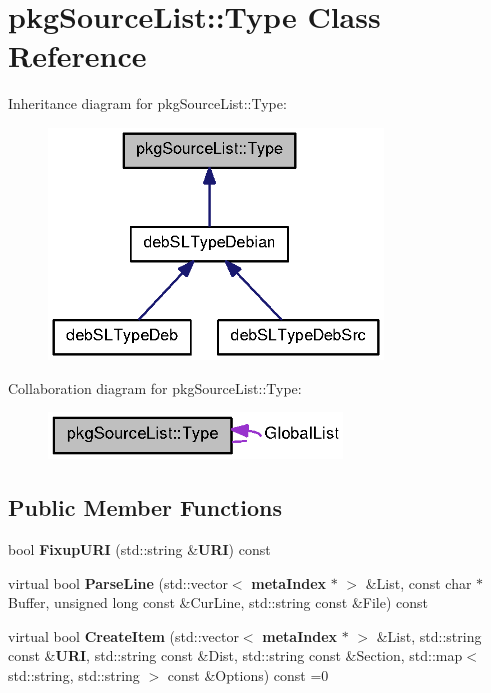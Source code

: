 \section{pkg\-Source\-List\-:\-:\-Type \-Class \-Reference}
\label{classpkgSourceList_1_1Type}


\-Inheritance diagram for pkg\-Source\-List\-:\-:\-Type\-:
\nopagebreak
\begin{figure}[H]
\begin{center}
\leavevmode
\includegraphics[width=252pt]{classpkgSourceList_1_1Type__inherit__graph}
\end{center}
\end{figure}


\-Collaboration diagram for pkg\-Source\-List\-:\-:\-Type\-:
\nopagebreak
\begin{figure}[H]
\begin{center}
\leavevmode
\includegraphics[width=221pt]{classpkgSourceList_1_1Type__coll__graph}
\end{center}
\end{figure}
\subsection*{\-Public \-Member \-Functions}
\begin{DoxyCompactItemize}
\item 
bool {\bfseries \-Fixup\-U\-R\-I} (std\-::string \&{\bf \-U\-R\-I}) const \label{classpkgSourceList_1_1Type_a42dffda008541948a897df68efd7ac11}

\item 
virtual bool {\bfseries \-Parse\-Line} (std\-::vector$<$ {\bf meta\-Index} $\ast$ $>$ \&\-List, const char $\ast$\-Buffer, unsigned long const \&\-Cur\-Line, std\-::string const \&\-File) const \label{classpkgSourceList_1_1Type_a07414bbf2e684ee25e5cf21f4e6fbf12}

\item 
virtual bool {\bfseries \-Create\-Item} (std\-::vector$<$ {\bf meta\-Index} $\ast$ $>$ \&\-List, std\-::string const \&{\bf \-U\-R\-I}, std\-::string const \&\-Dist, std\-::string const \&\-Section, std\-::map$<$ std\-::string, std\-::string $>$ const \&\-Options) const =0\label{classpkgSourceList_1_1Type_a60a792708b15ff816a72fdde21e5e964}

\end{DoxyCompactItemize}
